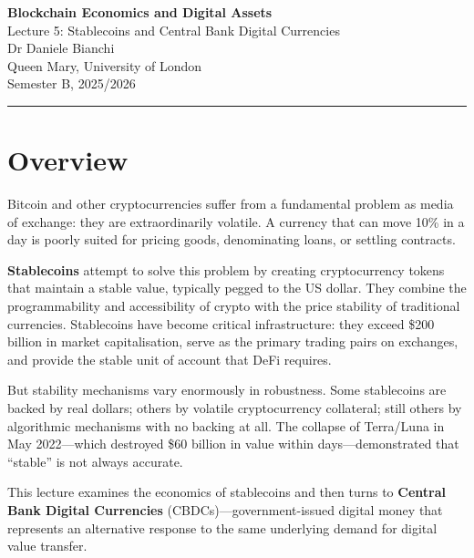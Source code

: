\documentclass[11pt,a4paper]{article}
\newcommand{\keyword}[1]{\textbf{\textcolor{AccentOrange}{#1}}}
\begin{document}
\begin{center}
    {\LARGE\bfseries\textcolor{ImperialBlue}{Blockchain Economics and Digital Assets}}\\[0.5em]
    {\Large Lecture 5: Stablecoins and Central Bank Digital Currencies}\\[1em]
    {\large Dr Daniele Bianchi}\\[0.5em]
    {\normalsize Queen Mary, University of London}\\[0.3em]
    {\normalsize Semester B, 2025/2026}
\end{center}

\vspace{1em}
\hrule
\vspace{1em}

\tableofcontents

\vspace{2cm}

\section*{Overview}

Bitcoin and other cryptocurrencies suffer from a fundamental problem as media of exchange: they are extraordinarily volatile. A currency that can move 10\% in a day is poorly suited for pricing goods, denominating loans, or settling contracts.

\keyword{Stablecoins} attempt to solve this problem by creating cryptocurrency tokens that maintain a stable value, typically pegged to the US dollar. They combine the programmability and accessibility of crypto with the price stability of traditional currencies. Stablecoins have become critical infrastructure: they exceed \$200 billion in market capitalisation, serve as the primary trading pairs on exchanges, and provide the stable unit of account that DeFi requires.

But stability mechanisms vary enormously in robustness. Some stablecoins are backed by real dollars; others by volatile cryptocurrency collateral; still others by algorithmic mechanisms with no backing at all. The collapse of Terra/Luna in May 2022---which destroyed \$60 billion in value within days---demonstrated that ``stable'' is not always accurate.

This lecture examines the economics of stablecoins and then turns to \keyword{Central Bank Digital Currencies} (CBDCs)---government-issued digital money that represents an alternative response to the same underlying demand for digital value transfer.
\end{document}
